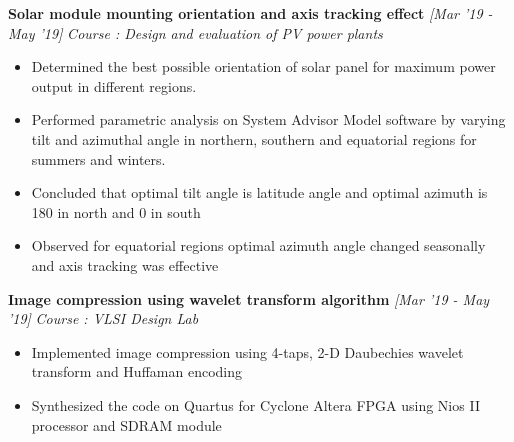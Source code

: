 \documentclass[10 pt]{article}%
\begin{document}
{\flushleft \textbf {\large{Solar module mounting orientation and axis tracking effect}} \hfill {{{\em{[Mar '19 - May '19]}}}}
\vspace{-0.8em}
{\flushleft \em{Course : Design and evaluation of PV power plants}}
\vspace{-5pt}
\begin{itemize}[leftmargin=*]
	\setlength\itemsep{1.5pt}
	\setlength\parskip{1.5pt}
  \item Determined the best possible orientation of solar panel for maximum power output in different regions.
\item Performed parametric analysis on System Advisor Model software by varying tilt and azimuthal angle in northern, southern and equatorial regions for summers and winters.
\item Concluded that optimal tilt angle is latitude angle and optimal azimuth is 180 in north and 0 in south
\item Observed for equatorial regions optimal azimuth angle changed seasonally and axis tracking was effective
\end{itemize}
{\flushleft \textbf {\large{Image compression using wavelet transform algorithm}} \hfill {{{\em{[Mar '19 - May '19]}}}}
	\vspace{-0.8em}
	{\flushleft \em{Course : VLSI Design Lab}}
	\vspace{-5pt}
	\begin{itemize}[leftmargin=*]
		\setlength\itemsep{1.5pt}
		\setlength\parskip{1.5pt}
		\item Implemented image compression using 4-taps, 2-D Daubechies wavelet transform and Huffaman encoding
		\item Synthesized the code on Quartus for Cyclone Altera FPGA using Nios II processor and SDRAM module

\end{itemize}}}
\end{document}
